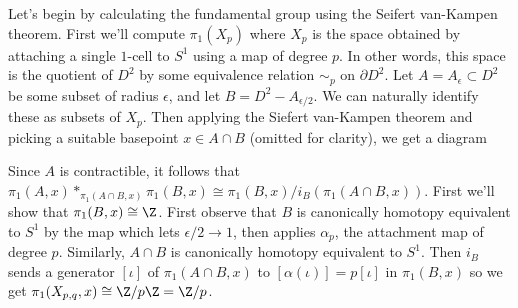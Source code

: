 \documentclass[11pt,letterpaper]{article}
\begin{document}
\begin{solution}
    \quad Let's begin by calculating the fundamental group using the Seifert van-Kampen theorem. First we'll compute $\pi_1(X_p)$ where $X_p$ is the space obtained by attaching a single $1$-cell to $S^1$ using a map of degree $p$. In other words, this space is the quotient of $D^2$ by some equivalence relation $\sim_p$ on $\partial D^2$. Let $A=A_\epsilon \subset D^2$ be some subset of radius $\epsilon$, and let $B=D^2-A_{\epsilon /2}$. We can naturally identify these as subsets of $X_p$. Then applying the Siefert van-Kampen theorem and picking a suitable basepoint $x\in A\cap B$ (omitted for clarity), we get a diagram
    \begin{center}
    \end{center}
    \quad Since $A$ is contractible, it follows that $\pi_1(A,x) *_{\pi_1(A\cap B,x)} \pi_1(B,x) \cong \pi_1(B,x) / i_B(\pi_1(A\cap B,x))$. First we'll show that $\pi_1(B,x)\cong \Z$. First observe that $B$ is canonically homotopy equivalent to $S^1$ by the map which lets $\epsilon /2\to 1$, then applies $\alpha_p$, the attachment map of degree $p$. Similarly, $A\cap B$ is canonically homotopy equivalent to $S^1$. Then $i_B$ sends a generator $[\iota]$ of $\pi_1(A\cap B,x)$ to $[\alpha(\iota)]=p[\iota]$ in $\pi_1(B,x)$ so we get $\pi_1(X_{p,q},x)\cong \Z /p\Z = \Z /p$.
    

\end{solution}
\end{document}
